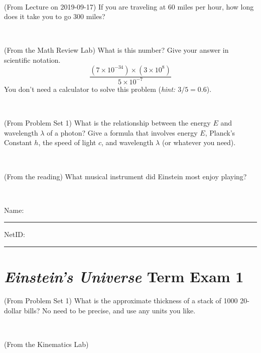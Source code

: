 \documentclass[12pt, letterpaper]{article}
\begin{document}
\vfill ~


\clearpage


\begin{problem} (From Lecture on 2019-09-17)
If you are traveling at 60 miles per hour, how long does
it take you to go 300 miles?
\end{problem}


\vfill ~

\begin{problem} (From the Math Review Lab)
What is this number? Give your answer in scientific notation.
$$
\frac{(7\times10^{-34})\times(3\times10^8)}{5\times10^{-7}}
$$
You don't need a calculator to solve this problem (\textit{hint: $3/5=0.6$}).
\end{problem}


\vfill ~

\begin{problem} (From Problem Set 1)
What is the relationship between the energy $E$ and wavelength
$\lambda$ of a photon? Give a formula that involves energy $E$,
Planck's Constant $h$, the speed of light $c$, and wavelength
$\lambda$ (or whatever you need).
\end{problem}

\vfill ~

\begin{problem} (From the reading)
What musical instrument did Einstein most enjoy playing?
\end{problem}


\vfill ~


\cleardoublepage



\noindent
Name: \rule[-1ex]{0.60\textwidth}{0.1pt}
NetID: \rule[-1ex]{0.20\textwidth}{0.1pt}

\section*{\textsl{Einstein's Universe} Term Exam 1}
\setcounter{problem}{1}


\begin{problem} (From Problem Set 1)
What is the approximate thickness of a stack of 1000 20-dollar bills?
No need to be precise, and use any units you like.
\end{problem}


\vfill ~

\begin{problem} (From the Kinematics Lab)

\end{problem}
\end{document}

